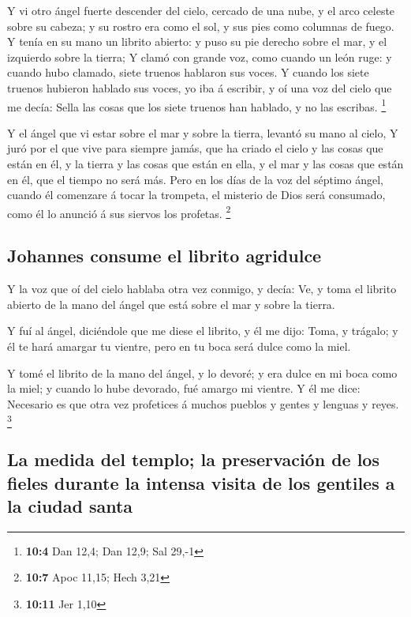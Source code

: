  Y vi otro ángel fuerte descender del cielo, cercado de
una nube, y el arco celeste sobre su cabeza; y su rostro era como el
sol, y sus pies como columnas de fuego.  Y tenía en su
mano un librito abierto: y puso su pie derecho sobre el mar, y el
izquierdo sobre la tierra;  Y clamó con grande voz, como
cuando un león ruge: y cuando hubo clamado, siete truenos hablaron sus
voces.  Y cuando los siete truenos hubieron hablado sus
voces, yo iba á escribir, y oí una voz del cielo que me decía: Sella las
cosas que los siete truenos han hablado, y no las escribas. \footnote{\textbf{10:4}
  Dan 12,4; Dan 12,9; Sal 29,-1}

 Y el ángel que vi estar sobre el mar y sobre la tierra,
levantó su mano al cielo,  Y juró por el que vive para
siempre jamás, que ha criado el cielo y las cosas que están en él, y la
tierra y las cosas que están en ella, y el mar y las cosas que están en
él, que el tiempo no será más.  Pero en los días de la voz
del séptimo ángel, cuando él comenzare á tocar la trompeta, el misterio
de Dios será consumado, como él lo anunció á sus siervos los profetas.
\footnote{\textbf{10:7} Apoc 11,15; Hech 3,21}

\hypertarget{johannes-consume-el-librito-agridulce}{%
\subsection{Johannes consume el librito
agridulce}\label{johannes-consume-el-librito-agridulce}}

 Y la voz que oí del cielo hablaba otra vez conmigo, y
decía: Ve, y toma el librito abierto de la mano del ángel que está sobre
el mar y sobre la tierra.

 Y fuí al ángel, diciéndole que me diese el librito, y él
me dijo: Toma, y trágalo; y él te hará amargar tu vientre, pero en tu
boca será dulce como la miel.

 Y tomé el librito de la mano del ángel, y lo devoré; y
era dulce en mi boca como la miel; y cuando lo hube devorado, fué amargo
mi vientre.  Y él me dice: Necesario es que otra vez
profetices á muchos pueblos y gentes y lenguas y reyes. \footnote{\textbf{10:11}
  Jer 1,10}

\hypertarget{la-medida-del-templo-la-preservaciuxf3n-de-los-fieles-durante-la-intensa-visita-de-los-gentiles-a-la-ciudad-santa}{%
\subsection{La medida del templo; la preservación de los fieles durante
la intensa visita de los gentiles a la ciudad
santa}\label{la-medida-del-templo-la-preservaciuxf3n-de-los-fieles-durante-la-intensa-visita-de-los-gentiles-a-la-ciudad-santa}}

